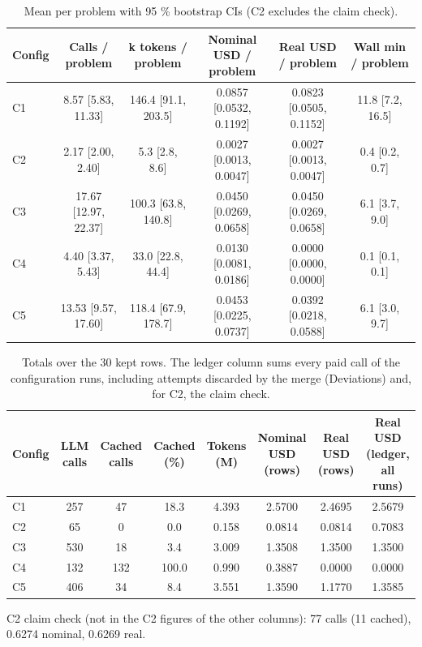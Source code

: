\begin{table}[t]
\centering
\scriptsize
\setlength{\tabcolsep}{3pt}
\caption{Mean per problem with 95 \% bootstrap CIs (C2 excludes the claim check).}
\label{tab:eff-problem}
\begin{tabular}{lccccc}
\toprule
Config & Calls / problem & k tokens / problem & Nominal USD / problem & Real USD / problem & Wall min / problem \\
\midrule
C1 & 8.57 {[}5.83, 11.33{]} & 146.4 {[}91.1, 203.5{]} & 0.0857 {[}0.0532, 0.1192{]} & 0.0823 {[}0.0505, 0.1152{]} & 11.8 {[}7.2, 16.5{]} \\
C2 & 2.17 {[}2.00, 2.40{]} & 5.3 {[}2.8, 8.6{]} & 0.0027 {[}0.0013, 0.0047{]} & 0.0027 {[}0.0013, 0.0047{]} & 0.4 {[}0.2, 0.7{]} \\
C3 & 17.67 {[}12.97, 22.37{]} & 100.3 {[}63.8, 140.8{]} & 0.0450 {[}0.0269, 0.0658{]} & 0.0450 {[}0.0269, 0.0658{]} & 6.1 {[}3.7, 9.0{]} \\
C4 & 4.40 {[}3.37, 5.43{]} & 33.0 {[}22.8, 44.4{]} & 0.0130 {[}0.0081, 0.0186{]} & 0.0000 {[}0.0000, 0.0000{]} & 0.1 {[}0.1, 0.1{]} \\
C5 & 13.53 {[}9.57, 17.60{]} & 118.4 {[}67.9, 178.7{]} & 0.0453 {[}0.0225, 0.0737{]} & 0.0392 {[}0.0218, 0.0588{]} & 6.1 {[}3.0, 9.7{]} \\
\bottomrule
\end{tabular}
\end{table}

\begin{table}[t]
\centering
\scriptsize
\setlength{\tabcolsep}{3pt}
\caption{Totals over the 30 kept rows. The ledger column sums every paid call of the configuration runs, including attempts discarded by the merge (Deviations) and, for C2, the claim check.}
\label{tab:totals}
\begin{tabular}{lccccccc}
\toprule
Config & LLM calls & Cached calls & Cached (\%) & Tokens (M) & Nominal USD (rows) & Real USD (rows) & Real USD (ledger, all runs) \\
\midrule
C1 & 257 & 47 & 18.3 & 4.393 & 2.5700 & 2.4695 & 2.5679 \\
C2 & 65 & 0 & 0.0 & 0.158 & 0.0814 & 0.0814 & 0.7083 \\
C3 & 530 & 18 & 3.4 & 3.009 & 1.3508 & 1.3500 & 1.3500 \\
C4 & 132 & 132 & 100.0 & 0.990 & 0.3887 & 0.0000 & 0.0000 \\
C5 & 406 & 34 & 8.4 & 3.551 & 1.3590 & 1.1770 & 1.3585 \\
\bottomrule
\end{tabular}

\vspace{2pt}
\parbox{\linewidth}{\scriptsize C2 claim check (not in the C2 figures of the other columns): 77 calls (11 cached), 0.6274 nominal, 0.6269 real.}
\end{table}

